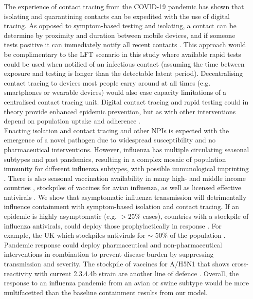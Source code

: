 \documentclass{article}
\begin{document}
The experience of contact tracing from the COVID-19 pandemic has shown that isolating and quarantining contacts can be expedited with the use of digital tracing. As opposed to symptom-based testing and isolating, a contact can be determine by proximity and duration between mobile devices, and if someone tests positive it can immediately notify all recent contacts \citep{ferrettiQuantifyingSARSCoV2Transmission2020}. This approach would be complimentary to the LFT scenario in this study where available rapid tests could be used when notified of an infectious contact (assuming the time between exposure and testing is longer than the detectable latent period). Decentralising contact tracing to devices most people carry around at all times (e.g. smartphones or wearable devices) would also ease capacity limitations of a centralised contact tracing unit. Digital contact tracing and rapid testing could in theory provide enhanced epidemic prevention, but as with other interventions depend on population uptake and adherence \citep{davisContactTracingImperfect2021, kendallEpidemiologicalImpactsNHS2023}. \\

Enacting isolation and contact tracing and other NPIs is expected with the emergence of a novel pathogen due to widespread susceptibility and no pharmaceutical interventions. However, influenza has multiple circulating seasonal subtypes and past pandemics, resulting in a complex mosaic of population immunity for different influenza subtypes, with possible immunological imprinting \citep{gosticPotentProtectionH5N12016}. There is also seasonal vaccination availability in many high- and middle income countries \citep{goldinSeasonalInfluenzaVaccination2024}, stockpiles of vaccines for avian influenza, as well as licensed effective antivirals \citep{krammerHighlyPathogenicAvian2025}. We show that asymptomatic influenza transmission will detrimentally influence containment with symptom-based isolation and contact tracing. If an epidemic is highly asymptomatic (e.g. $>25$\% cases), countries with a stockpile of influenza antivirals, could deploy those prophylactically in response \citep{haydenPerspectivesAntiviralUse2001}. For example, the UK which stockpiles antivirals for $\sim$ 50\% of the population \citep{ukparliamentWrittenQuestionsAnswers2021}. Pandemic response could deploy pharmaceutical and non-pharmaceutical interventions in combination to prevent disease burden by suppressing transmission and severity. The stockpile of vaccines for A/H5N1 that shows cross-reactivity with current 2.3.4.4b strain are another line of defence \citep{khuranaLicensedH5N1Vaccines2024}. Overall, the response to an influenza pandemic from an avian or swine subtype would be more multifacetted than the baseline containment results from our model. \\
\end{document}
